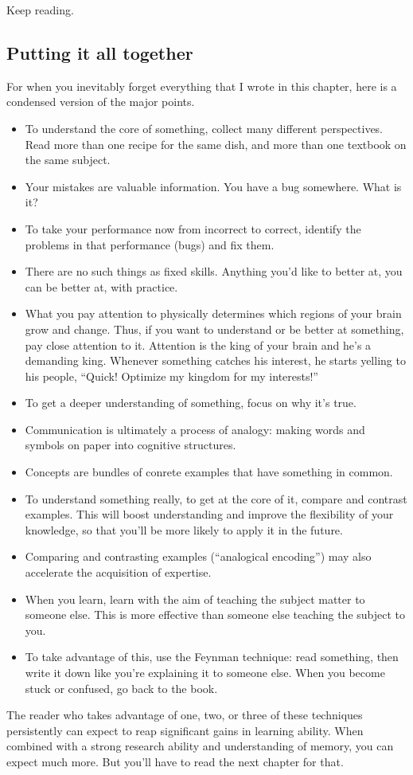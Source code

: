 Keep reading.

\subsection{Putting it all together}\label{putting-it-all-together}

For when you inevitably forget everything that I wrote in this chapter,
here is a condensed version of the major points.

\begin{itemize}
\itemsep1pt\parskip0pt
\item
  To understand the core of something, collect many different
  perspectives. Read more than one recipe for the same dish, and more
  than one textbook on the same subject.
\item
  Your mistakes are valuable information. You have a bug somewhere. What
  is it?
\item
  To take your performance now from incorrect to correct, identify the
  problems in that performance (bugs) and fix them.
\item
  There are no such things as fixed skills. Anything you'd like to
  better at, you can be better at, with practice.
\item
  What you pay attention to physically determines which regions of your
  brain grow and change. Thus, if you want to understand or be better at
  something, pay close attention to it. Attention is the king of your
  brain and he's a demanding king. Whenever something catches his
  interest, he starts yelling to his people, ``Quick! Optimize my
  kingdom for my interests!''
\item
  To get a deeper understanding of something, focus on why it's true.
\item
  Communication is ultimately a process of analogy: making words and
  symbols on paper into cognitive structures.
\item
  Concepts are bundles of conrete examples that have something in
  common.
\item
  To understand something really, to get at the core of it, compare and
  contrast examples. This will boost understanding and improve the
  flexibility of your knowledge, so that you'll be more likely to apply
  it in the future.
\item
  Comparing and contrasting examples (``analogical encoding'') may also
  accelerate the acquisition of expertise.
\item
  When you learn, learn with the aim of teaching the subject matter to
  someone else. This is more effective than someone else teaching the
  subject to you.
\item
  To take advantage of this, use the Feynman technique: read something,
  then write it down like you're explaining it to someone else. When you
  become stuck or confused, go back to the book.
\end{itemize}

The reader who takes advantage of one, two, or three of these techniques
persistently can expect to reap significant gains in learning ability.
When combined with a strong research ability and understanding of
memory, you can expect much more. But you'll have to read the next
chapter for that.
